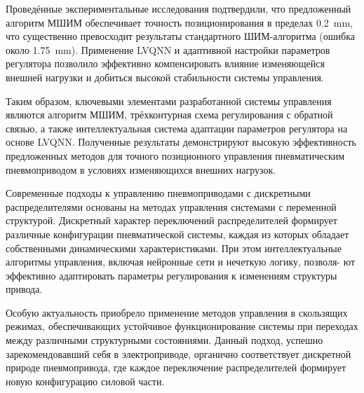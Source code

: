 Проведённые экспериментальные исследования подтвердили, что предложенный алгоритм МШИМ обеспечивает точность позиционирования
в пределах \num{0.2}~\si{\milli\metre}, что существенно превосходит результаты стандартного ШИМ-алгоритма (ошибка около \num{1.75}~\si{\milli\metre}). Применение
LVQNN и адаптивной настройки параметров регулятора позволило эффективно компенсировать влияние изменяющейся внешней нагрузки и
добиться высокой стабильности системы управления.

Таким образом, ключевыми элементами разработанной системы управления являются алгоритм МШИМ,
трёхконтурная схема регулирования с обратной связью, а также интеллектуальная система адаптации параметров
регулятора на основе LVQNN. Полученные результаты демонстрируют высокую эффективность предложенных методов для точного
позиционного управления пневматическим пневмоприводом в условиях изменяющихся внешних нагрузок.

Современные подходы к управлению пневмоприводами с дискретными распределителями основаны на
методах управления системами с переменной структурой. Дискретный характер переключений распределителей
формирует различные конфигурации пневматической системы, каждая из которых обладает собственными
динамическими характеристиками. При этом интеллектуальные алгоритмы управления, включая нейронные
сети и нечеткую логику, позволя- ют эффективно адаптировать параметры регулирования к изменениям
структуры привода.

Особую актуальность приобрело применение методов управления в скользящих режимах,
обеспечивающих устойчивое функционирование системы при переходах между различными структурными состояниями.
Данный подход, успешно зарекомендовавший себя в электроприводе, органично соответствует дискретной природе
пневмопривода, где каждое переключение распределителей формирует новую конфигурацию силовой части.




